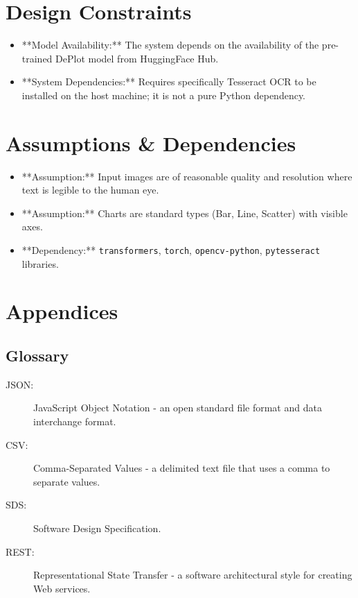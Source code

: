 \documentclass[12pt, a4paper]{article}
\begin{document}
\section{Design Constraints}
\begin{itemize}
    \item **Model Availability:** The system depends on the availability of the pre-trained DePlot model from HuggingFace Hub.
    \item **System Dependencies:** Requires specifically Tesseract OCR to be installed on the host machine; it is not a pure Python dependency.
\end{itemize}

\section{Assumptions \& Dependencies}
\begin{itemize}
    \item **Assumption:** Input images are of reasonable quality and resolution where text is legible to the human eye.
    \item **Assumption:** Charts are standard types (Bar, Line, Scatter) with visible axes.
    \item **Dependency:** \texttt{transformers}, \texttt{torch}, \texttt{opencv-python}, \texttt{pytesseract} libraries.
\end{itemize}

\section{Appendices}
\subsection{Glossary}
\begin{description}
    \item[JSON:] JavaScript Object Notation - an open standard file format and data interchange format.
    \item[CSV:] Comma-Separated Values - a delimited text file that uses a comma to separate values.
    \item[SDS:] Software Design Specification.
    \item[REST:] Representational State Transfer - a software architectural style for creating Web services.
\end{description}
\end{document}
